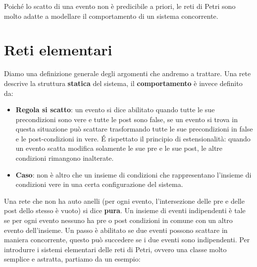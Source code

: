 Poiché lo scatto di una evento non è predicibile a priori, le reti di Petri sono molto adatte a modellare il comportamento di un sistema concorrente. 


\section{Reti elementari}
Diamo una definizione generale degli argomenti che andremo a trattare.
Una rete descrive la struttura \textbf{statica} del sistema, il \textbf{comportamento} è invece definito da: 
\begin{itemize}
    \item \textbf{Regola si scatto}: un evento si dice abilitato quando tutte le sue precondizioni sono vere e tutte le
post sono false, se un evento si trova in questa situazione può scattare trasformando tutte le sue
precondizioni in false e le post-condizioni in vere. É rispettato il principio di estensionalità: quando
un evento scatta modifica solamente le sue pre e le sue post, le altre condizioni rimangono
inalterate.
    \item \textbf{Caso}: non è altro che un insieme di condizioni che rappresentano
l’insieme di condizioni vere in una certa configurazione del sistema.
\end{itemize}
Una rete che non ha auto anelli (per ogni evento, l’intersezione delle pre e delle post dello stesso è vuoto) si dice \textbf{pura}. Un insieme di eventi indipendenti è tale se per ogni evento nessuno ha pre o post condizioni in comune con un altro evento dell’insieme. Un passo è abilitato se due eventi possono scattare in maniera concorrente, questo può
succedere se i due eventi sono indipendenti.
Per introdurre i sistemi elementari delle reti di Petri, ovvero una classe molto
semplice e astratta, partiamo da un esempio:
